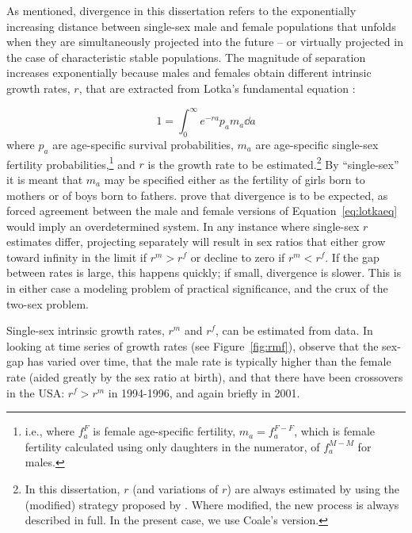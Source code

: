  \FloatBarrier
 \label{sex:divlotkar}
As mentioned, divergence in this dissertation refers to the exponentially
increasing distance between single-sex male and female populations that unfolds
when they are simultaneously projected into the future -- or virtually projected
in the case of characteristic stable populations. The magnitude of separation increases
exponentially because males and females obtain different intrinsic 
growth rates, $r$, that are extracted from Lotka's fundamental equation
\citep{sharpe1911problem}:

\begin{equation}
\label{eq:lotkaeq}
1 = \int _0 ^\infty e^{-ra}p_a m_a \dd a 
\end{equation}
where $p_a$ are age-specific survival probabilities, $m_a$ are age-specific
single-sex fertility probabilities,\footnote{i.e., where $f_a^F$ is female
age-specific fertility,  $m_a = f_a^{F-F}$, which is female fertility calculated
using only daughters in the numerator, of $f_a^{M-M}$ for males.} and $r$ is
the growth rate to be estimated.\footnote{In this dissertation, $r$ (and 
variations of $r$) are always estimated by using the (modified) strategy proposed 
by \citet{coale1957new}. Where modified, the new process is always described in full. In the present
case, we use Coale's version.} By ``single-sex'' it is meant that $m_a$ may
be specified either as the fertility of girls born to mothers or of boys born to
fathers. \citet{yellin1977comparison} prove that divergence is to be expected, as 
forced agreement between the male and female versions of Equation~\eqref{eq:lotkaeq}
 would imply an overdetermined system. In any instance
where single-sex $r$ estimates differ, projecting separately will result in sex
ratios that either grow toward infinity in the limit if $r^m
> r^f$ or decline to zero if $r^m < r^f$. If the gap between rates is large, this happens
quickly; if small, divergence is slower. This is in either case a modeling
problem of practical significance, and the crux of the two-sex problem. 

Single-sex intrinsic growth rates, $r^m$ and $r^f$, can be 
estimated from data. In looking at time series of 
 growth rates (see Figure~\ref{fig:rmf}), observe that the sex-gap has varied
 over time, that the male rate is typically higher than the female rate (aided greatly 
by the sex ratio at birth), and that there have been crossovers in the USA: 
$r^f > r^m$ in 1994-1996, and again briefly in 2001. 

